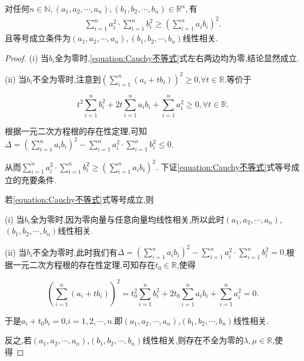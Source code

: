 \documentclass[lang=cn,newtx,10pt,scheme=chinese]{elegantbook}
\begin{document}
\begin{theorem}[Cauchy不等式]\label{theorem:Cauchy不等式}
   对任何$n\in \mathbb{N} ,\left( a_1,a_2,\cdots ,a_n \right) ,\left( b_1,b_2,\cdots ,b_n \right) \in \mathbb{R} ^n,$有
   \begin{align}\label{equation:Cauchy不等式}
      \sum\limits_{i=1}^n{a_{i}^{2}\cdot}\sum\limits_{i=1}^n{b_{i}^{2}}\geqslant \left( \sum\limits_{i=1}^n{a_ib_i} \right) ^2.
   \end{align}
   且等号成立条件为$\left( a_1,a_2,\cdots ,a_n \right) ,\left( b_1,b_2,\cdots ,b_n \right)$线性相关.
\end{theorem}
\begin{proof}
   (i) 当\(b_i\)全为零时,\eqref{equation:Cauchy不等式}式左右两边均为零,结论显然成立.

(ii) 当\(b_i\)不全为零时,注意到\(\left(\sum\limits_{i = 1}^{n}(a_i + tb_i)\right)^2 \geqslant 0\),\(\forall t \in \mathbb{R}\).等价于

\[
t^2\sum\limits_{i = 1}^{n}b_{i}^{2} + 2t\sum\limits_{i = 1}^{n}a_ib_i + \sum\limits_{i = 1}^{n}a_{i}^{2} \geqslant 0,  \forall t \in \mathbb{R}.
\]

根据一元二次方程根的存在性定理,可知\(\Delta = \left(\sum\limits_{i = 1}^{n}a_ib_i\right)^2 - \sum\limits_{i = 1}^{n}a_{i}^{2} \cdot \sum\limits_{i = 1}^{n}b_{i}^{2} \leqslant 0\).

从而\(\sum\limits_{i = 1}^{n}a_{i}^{2} \cdot \sum\limits_{i = 1}^{n}b_{i}^{2} \geqslant \left(\sum\limits_{i = 1}^{n}a_ib_i\right)^2\).
下证\eqref{equation:Cauchy不等式}式等号成立的充要条件.

若\eqref{equation:Cauchy不等式}式等号成立,则

(i) 当\(b_i\)全为零时,因为零向量与任意向量均线性相关,所以此时\((a_1,a_2,\cdots,a_n)\),\((b_1,b_2,\cdots,b_n)\)线性相关.

(ii) 当\(b_i\)不全为零时,此时我们有\(\Delta = \left(\sum\limits_{i = 1}^{n}a_ib_i\right)^2 - \sum\limits_{i = 1}^{n}a_{i}^{2} \cdot \sum\limits_{i = 1}^{n}b_{i}^{2} = 0\).根据一元二次方程根的存在性定理,可知存在\(t_0 \in \mathbb{R}\),使得

\[
\left(\sum\limits_{i = 1}^{n}(a_i + tb_i)\right)^2 = t_{0}^{2}\sum\limits_{i = 1}^{n}b_{i}^{2} + 2t_0\sum\limits_{i = 1}^{n}a_ib_i + \sum\limits_{i = 1}^{n}a_{i}^{2} = 0.
\]

于是\(a_i + t_0b_i = 0\),\(i = 1,2,\cdots,n\).即\((a_1,a_2,\cdots,a_n)\),\((b_1,b_2,\cdots,b_n)\)线性相关.

反之,若\((a_1,a_2,\cdots,a_n)\),\((b_1,b_2,\cdots,b_n)\)线性相关,则存在不全为零的\(\lambda,\mu \in \mathbb{R}\),使得


\end{proof}
\end{document}
